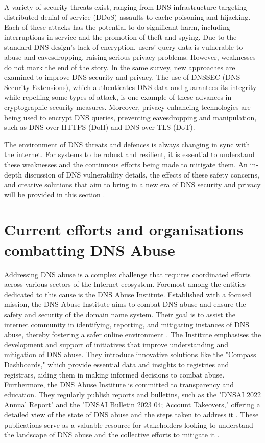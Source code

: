 A variety of security threats exist, ranging from DNS infrastructure-targeting distributed denial of service (DDoS) assaults to cache poisoning and hijacking. Each of these attacks has the potential to do significant harm, including interruptions in service and the promotion of theft and spying. Due to the standard DNS design's lack of encryption, users' query data is vulnerable to abuse and eavesdropping, raising serious privacy problems. However, weaknesses do not mark the end of the story. In the same survey, new approaches are examined to improve DNS security and privacy. The use of DNSSEC (DNS Security Extensions), which authenticates DNS data and guarantees its integrity while repelling some types of attack, is one example of these advances in cryptographic security measures. Moreover, privacy-enhancing technologies are being used to encrypt DNS queries, preventing eavesdropping and manipulation, such as DNS over HTTPS (DoH) and DNS over TLS (DoT).

The environment of DNS threats and defences is always changing in sync with the internet. For systems to be robust and resilient, it is essential to understand these weaknesses and the continuous efforts being made to mitigate them. An in-depth discussion of DNS vulnerability details, the effects of these safety concerns, and creative solutions that aim to bring in a new era of DNS security and privacy will be provided in this section \cite{sciencedirect2023dns}.

\section{Current efforts and organisations combatting DNS Abuse}

Addressing DNS abuse is a complex challenge that requires coordinated efforts across various sectors of the Internet ecosystem. Foremost among the entities dedicated to this cause is the DNS Abuse Institute. Established with a focused mission, the DNS Abuse Institute aims to combat DNS abuse and ensure the safety and security of the domain name system. Their goal is to assist the internet community in identifying, reporting, and mitigating instances of DNS abuse, thereby fostering a safer online environment \cite{dnsabuseinstitute2023}. The Institute emphasises the development and support of initiatives that improve understanding and mitigation of DNS abuse. They introduce innovative solutions like the "Compass Dashboards," which provide essential data and insights to registries and registrars, aiding them in making informed decisions to combat abuse. Furthermore, the DNS Abuse Institute is committed to transparency and education. They regularly publish reports and bulletins, such as the "DNSAI 2022 Annual Report" and the "DNSAI Bulletin 2023 04; Account Takeovers," offering a detailed view of the state of DNS abuse and the steps taken to address it \cite{dnsabuseinstitute2023} . These publications serve as a valuable resource for stakeholders looking to understand the landscape of DNS abuse and the collective efforts to mitigate it \cite{dnsai2022report}.

